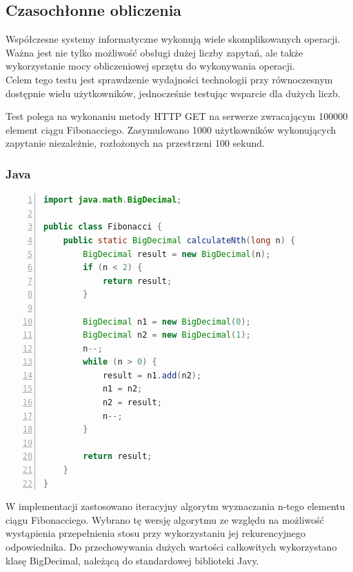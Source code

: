 \documentclass[12pt,twoside]{article}
\begin{document}
\clearpage

\subsection{Czasochłonne obliczenia}\label{czasochux142onne-obliczenia}

Współczesne systemy informatyczne wykonują wiele skomplikowanych
operacji. Ważna jest nie tylko możliwość obsługi dużej liczby zapytań,
ale także wykorzystanie mocy obliczeniowej sprzętu do wykonywania
operacji.\\
Celem tego testu jest sprawdzenie wydajności technologii przy
równoczesnym dostępnie wielu użytkowników, jednocześnie testując
wsparcie dla dużych liczb.

Test polega na wykonaniu metody HTTP GET na serwerze zwracającym 100000
element ciągu Fibonacciego. Zasymulowano 1000 użytkowników wykonujących
zapytanie niezależnie, rozłożonych na przestrzeni 100 sekund.

\subsubsection{Java}\label{java-1}

\begin{lstlisting}[language=Java, numbers=left, caption=Java - obliczanie n-tego elementu ciągu Fibonacciego]
import java.math.BigDecimal;

public class Fibonacci {
    public static BigDecimal calculateNth(long n) {
        BigDecimal result = new BigDecimal(n);
        if (n < 2) {
            return result;
        }

        BigDecimal n1 = new BigDecimal(0);
        BigDecimal n2 = new BigDecimal(1);
        n--;
        while (n > 0) {
            result = n1.add(n2);
            n1 = n2;
            n2 = result;
            n--;
        }

        return result;
    }
}
\end{lstlisting}

W implementacji zastosowano iteracyjny algorytm wyznaczania n-tego
elementu ciągu Fibonacciego. Wybrano tę wersję algorytmu ze względu na
możliwość wystąpienia przepełnienia stosu przy wykorzystaniu jej
rekurencyjnego odpowiednika. Do przechowywania dużych wartości
całkowitych wykorzystano klasę BigDecimal, należącą do standardowej
biblioteki Javy.
\end{document}
